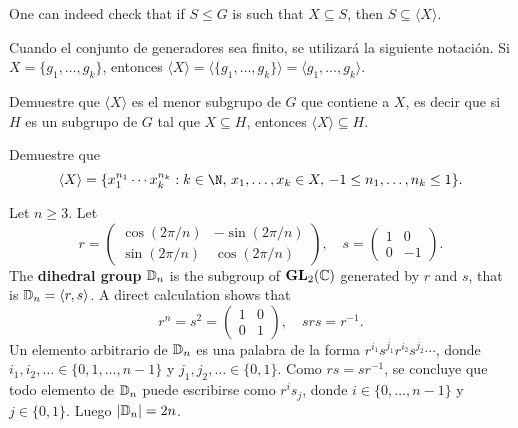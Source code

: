 One can indeed check that if $S\leq G$ is such that $X\subseteq S$, then
$S\subseteq\langle X\rangle$. 



Cuando el conjunto de generadores sea finito, se utilizará la siguiente notación. Si $X=\{g_1,\dots,g_k\}$, entonces $\langle
X\rangle=\langle\{g_1,\dots,g_k\}\rangle=\langle g_1,\dots,g_k\rangle$.

\begin{exercise}
Demuestre que $\langle
X\rangle$ es el menor subgrupo de $G$ que contiene a $X$, es decir que si $H$ es un subgrupo de $G$ tal que $X\subseteq H$, entonces $\langle X\rangle\subseteq H$.
\end{exercise}

\begin{exercise}
Demuestre que
\[
        \langle X\rangle=\{x_1^{n_1}\cdots x_k^{n_k}:k\in\N,\,x_1,\dots,x_k\in X,\,-1\leq n_1,\dots,n_k\leq 1\}.
\]
\end{exercise}

\begin{example}
Let $n\geq3$. Let 
\[
r=\begin{pmatrix}
\cos(2\pi/n) & -\sin(2\pi/n)\\
\sin(2\pi/n) & \cos(2\pi/n)
\end{pmatrix},
\quad
s=\begin{pmatrix}
        1 & 0\\
        0 & -1
\end{pmatrix}.
\]
The \textbf{dihedral group} $\mathbb{D}_n$ is the subgroup of
$\mathbf{GL}_2(\mathbb{C})$ generated by $r$ and $s$,
that is $\mathbb{D}_n=\langle r,s\rangle$. A direct calculation shows that 
\[
r^n=s^2=\begin{pmatrix}
        1&0\\
        0&1
\end{pmatrix},
\quad
srs=r^{-1}.
\]
Un elemento arbitrario de $\mathbb{D}_n$ es una palabra
de la forma $r^{i_1}s^{j_1}r^{i_2}s^{j_2}\cdots$, donde $i_1,i_2,\dots\in\{0,1,\dots,n-1\}$ y
$j_1,j_2,\dots\in\{0,1\}$. Como $rs=sr^{-1}$, se concluye que
todo elemento de $\mathbb{D}_n$ puede escribirse como $r^is_j$,
donde $i\in\{0,\dots,n-1\}$ y $j\in\{0,1\}$. Luego
$|\mathbb{D}_n|=2n$.
\end{example}